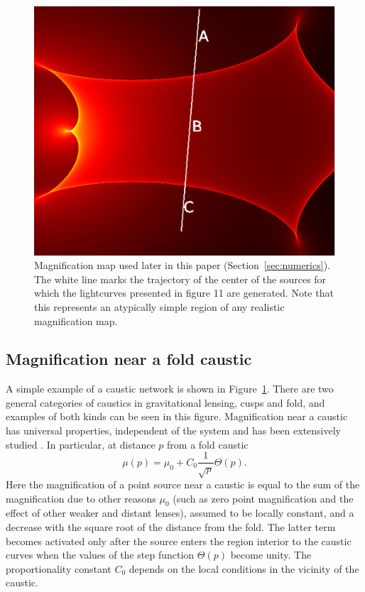 \documentclass[usenatbib]{mn2e}
\begin{document}
\begin{figure}
\centering
\includegraphics[width=0.9\hsize]{figures/IRIS567_path.eps}
\caption{\label{fig:magnification_map} Magnification map used later in
  this paper (Section~\ref{sec:numerics}). The white line marks the
  trajectory of the center of the sources for which the lightcurves
  presented in figure 11 are generated.  Note that this represents an
  atypically simple region of any realistic magnification map.}
\end{figure}


\subsection{Magnification near a fold caustic}

A simple example of a caustic network is shown in
Figure~\ref{fig:magnification_map}.  There are two general categories
of caustics in gravitational lensing, cusps and fold, and examples of
both kinds can be seen in this figure.  Magnification near a caustic
has universal properties, independent of the system and has been
extensively studied
\citep{1986ApJ...310..568B,1992A&A...260....1S,2002ApJ...574..970G,2002ApJ...580..468G}.
In particular, at distance $p$ from a fold caustic
\begin {equation}
 \mu(p) = \mu_0 + C_0 \frac{1}{\sqrt{p}} \Theta(p).
\end {equation}
Here the magnification of a point source near a caustic is equal to
the sum of the magnification due to other reasons $\mu_0$ 
(such as zero point magnification and the effect of other weaker and 
distant lenses), assumed to
be locally constant, and a decrease with the square root of the
distance from the fold. The latter term becomes activated only after
the source enters the region interior to the caustic curves when the
values of the step function $\Theta(p)$ become unity. The
proportionality constant $C_0$ depends on the local conditions in the
vicinity of the caustic.
\end{document}
